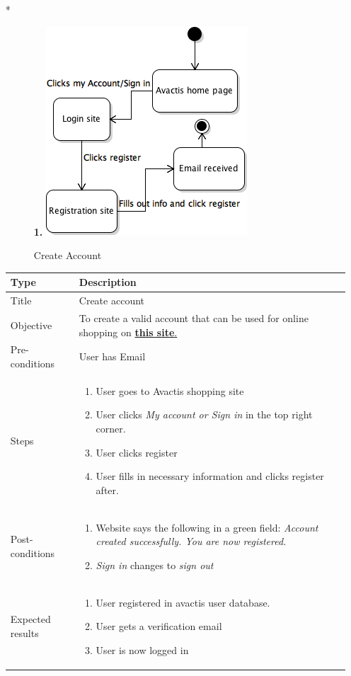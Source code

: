 \documentclass[UKenglish,12pt]{article}
\begin{document}
\begin{itemize}%
\item[*]
\begin{figure}[!htbp]
\textbf{1.\newline}
\centering
\includegraphics[scale=0.7,keepaspectratio]{Images/CreateAccount.png}
\caption{Create Account}
\end{figure}

\begin{table}[!htbp]
\small
\begin{tabular}{| p{5cm} | p{10cm} | }
	\hline
	\textbf{Type} & \textbf{Description} \\ \hline
	 Title & Create account\\ \hline
	 Objective & To create a valid account that can be used for online shopping on \href{http://demo.avactis.com/4.7.9/}{\textbf{this site}.} \\ \hline
	 Pre-conditions & User has Email\\ \hline
	 Steps & \begin{enumerate} \item User goes to Avactis shopping site \item User clicks \textit{My account or  Sign in} in the top right corner. \item User clicks register \item User fills in necessary information and clicks register after.\end{enumerate} \\ \hline
	 Post-conditions & \begin{enumerate} \item Website says the following in a green field: \textit{Account created successfully. You are now registered.} \item \textit{Sign in} changes to \textit{sign out} \end{enumerate}\\ \hline
	 Expected results & \begin{enumerate} \item User registered in avactis user database. \item User gets a verification email \item User is now logged in \end{enumerate}\\ 
	 \hline
\end{tabular} %
\end{table}


\end{itemize}
\end{document}
